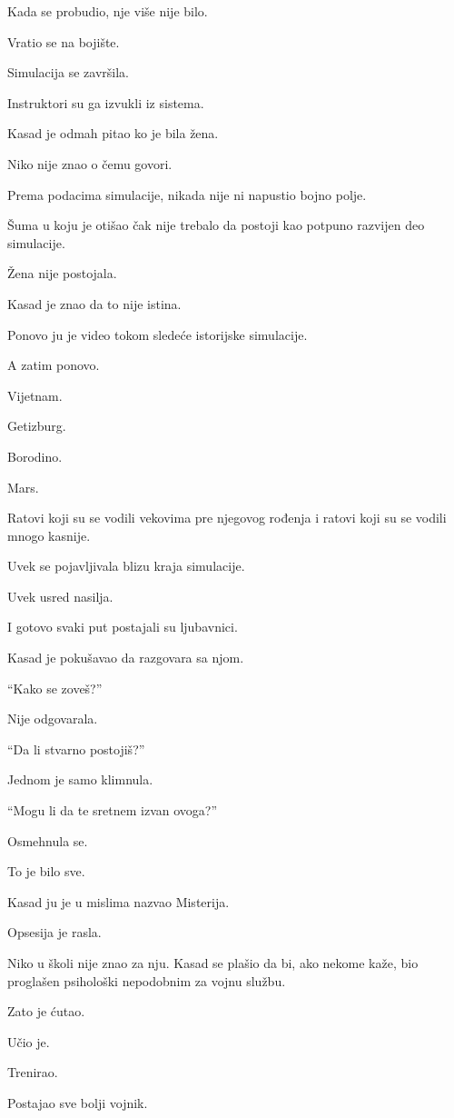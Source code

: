 Kada se probudio, nje više nije bilo.

Vratio se na bojište.

Simulacija se završila.

Instruktori su ga izvukli iz sistema.

Kasad je odmah pitao ko je bila žena.

Niko nije znao o čemu govori.

Prema podacima simulacije, nikada nije ni napustio bojno polje.

Šuma u koju je otišao čak nije trebalo da postoji kao potpuno razvijen deo simulacije.

Žena nije postojala.

Kasad je znao da to nije istina.

\bigskip

Ponovo ju je video tokom sledeće istorijske simulacije.

A zatim ponovo.

Vijetnam.

Getizburg.

Borodino.

Mars.

Ratovi koji su se vodili vekovima pre njegovog rođenja i ratovi koji su se vodili mnogo kasnije.

Uvek se pojavljivala blizu kraja simulacije.

Uvek usred nasilja.

I gotovo svaki put postajali su ljubavnici.

Kasad je pokušavao da razgovara sa njom.

``Kako se zoveš?''

Nije odgovarala.

``Da li stvarno postojiš?''

Jednom je samo klimnula.

``Mogu li da te sretnem izvan ovoga?''

Osmehnula se.

To je bilo sve.

Kasad ju je u mislima nazvao Misterija.

Opsesija je rasla.

Niko u školi nije znao za nju. Kasad se plašio da bi, ako nekome kaže, bio proglašen psihološki nepodobnim za vojnu službu.

Zato je ćutao.

Učio je.

Trenirao.

Postajao sve bolji vojnik.

